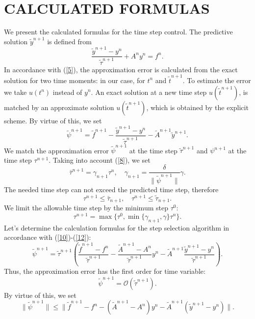 \documentclass{aip-cp}
\begin{document}
\section{CALCULATED FORMULAS}
We present the calculated formulas for the time step control. 
The predictive solution $\widetilde{y}^{n+1} $  is defined from
\[
  \frac{\widetilde{y}^{n+1} - y^{n}}{\widetilde{\tau}^{n+1}} + A^{n} y^{n} 
  = f^{n} .
\]
In accordance with (\ref{5}), the approximation error is calculated from the exact solution for two time moments: in our case, for $t^n$ and $\widetilde{t}^{n+1}$.
To estimate the error we take $u(t^n)$ instead of $y^n$. An exact solution at a new time step $u(\widetilde{t}^{n+1})$, is matched by an approximate solution $u(\widetilde{t}^{n+1})$, which is obtained by the explicit scheme. By virtue of this, we set
\begin{equation}\label{10}
 \widetilde{\psi}^{n+1}  = \widetilde{f}^{n+1} -
 \frac{\widetilde{y}^{n+1} - y^{n}}{\widetilde{\tau}^{n+1}} -
 \widetilde{A}^{n+1} \widetilde{y}^{n+1} . 
\end{equation} 
We match the approximation error $\widetilde{\psi}^{n+1}$ at the time step $\widetilde{\tau}^{n+1}$ and $\psi^{n+1}$ at the time step $\tau^{n+1}$.
Taking into account (\ref{8}), we set
\begin{equation}\label{11}
  \bar{\tau}^{n+1} = \gamma_{n+1} \tau^n,
  \quad \gamma_{n+1} = \frac{\delta}{\| \widetilde{\psi}^{n+1}\|}  \gamma.
\end{equation} 
The needed time step can not exceed the predicted time step, therefore
\[
\tau^{n+1} \leq \bar{\tau}_{n+1}, \quad \tau^{n+1} \leq \widetilde{\tau}_{n+1}.
\] 
We limit the allowable time step by the minimum step $\tau^0$:
\begin{equation}\label{12}
 \tau^{n+1} = \max \big \{\tau^0, \min \{\gamma_{n+1}, \gamma \} \tau^n \big \}. 
\end{equation}
Let's determine  the calculation formulas for the step selection algorithm in accordance with (\ref{10})-(\ref{12}):
\[
 \widetilde{\psi}^{n+1} = \widetilde{\tau}^{n+1} \left( \frac{\widetilde{f}^{n+1} - f^n}{\widetilde{\tau}^{n+1}}  - \frac{\widetilde{A}^{n+1} - A^n}{\widetilde{\tau}^{n+1}}  y^n - \widetilde{A}^{n+1} \frac{\widetilde{y}^{n+1} - y^n}{\widetilde{\tau}^{n+1}}  \right ) .
\] 
Thus, the approximation error has the first order for
time variable:
\[
 \widetilde{\psi}^{n+1} = \mathcal{O} (\widetilde{\tau}^{n+1}) .
\] 
By virtue of this, we set 
\begin{equation}\label{13}
 \|\widetilde{\psi}^{n+1} \| \leq \|\widetilde{f}^{n+1} - f^n  -
 (\widetilde{A}^{n+1} - A^n) y^n -
 \widetilde{A}^{n+1} (\widetilde{y}^{n+1} - y^n) \| .
\end{equation} 
\end{document}
